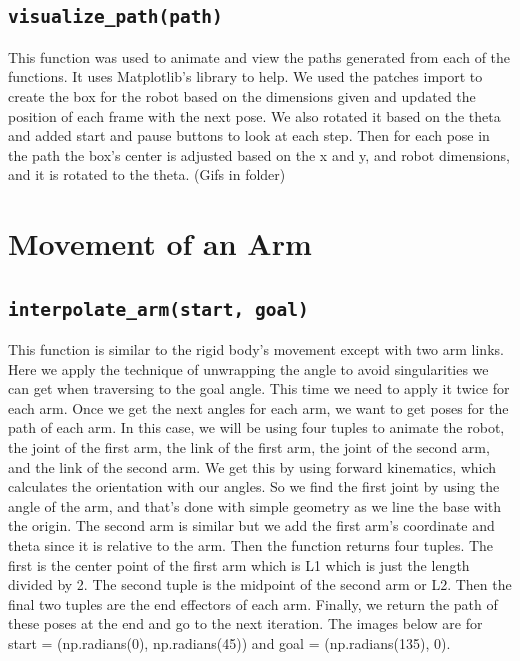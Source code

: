 \documentclass{article}
\begin{document}
\subsection{\texttt{visualize\_path(path)}}


This function was used to animate and view the paths generated from each of the functions. It uses Matplotlib's library to help. We used the patches import to create the box for the robot based on the dimensions given and updated the position of each frame with the next pose. We also rotated it based on the theta and added start and pause buttons to look at each step. Then for each pose in the path the box's center is adjusted based on the x and y, and robot dimensions, and it is rotated to the theta. (Gifs in folder)

\section{Movement of an Arm}


\subsection{\texttt{interpolate\_arm(start, goal)}}

This function is similar to the rigid body's movement except with two arm links. Here we apply the technique of unwrapping the angle to avoid singularities we can get when traversing to the goal angle. This time we need to apply it twice for each arm. Once we get the next angles for each arm, we want to get poses for the path of each arm. In this case, we will be using four tuples to animate the robot, the joint of the first arm, the link of the first arm, the joint of the second arm, and the link of the second arm. We get this by using forward kinematics, which calculates the orientation with our angles. So we find the first joint by using the angle of the arm, and that's done with simple geometry as we line the base with the origin. The second arm is similar but we add the first arm's coordinate and theta since it is relative to the arm. Then the function returns four tuples. The first is the center point of the first arm which is L1 which is just the length divided by 2. The second tuple is the midpoint of the second arm or L2. Then the final two tuples are the end effectors of each arm. Finally, we return the path of these poses at the end and go to the next iteration. The images below are for start =  (np.radians(0), np.radians(45)) and goal = (np.radians(135), 0).
\end{document}
